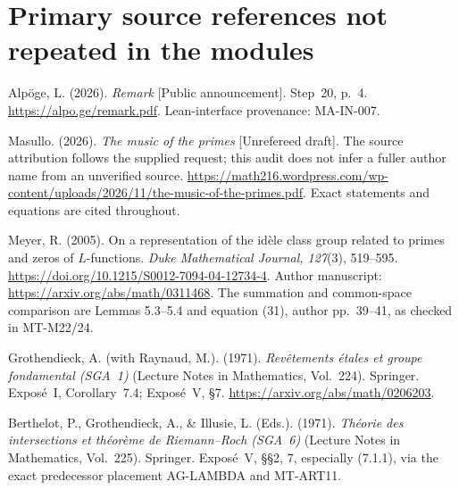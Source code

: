 \documentclass[11pt,a4paper]{article}
\begin{document}
\section{Primary source references not repeated in the modules}
Alp\"oge, L. (2026). \emph{Remark} [Public announcement].
Step~20, p.~4. \url{https://alpo.ge/remark.pdf}.
Lean-interface provenance: MA-IN-007.

Masullo. (2026). \emph{The music of the primes} [Unrefereed draft].
The source attribution follows the supplied request; this audit
does not infer a fuller author name from an unverified source.
\url{https://math216.wordpress.com/wp-content/uploads/2026/11/the-music-of-the-primes.pdf}.
Exact statements and equations are cited throughout.

Meyer, R. (2005). On a representation of the id\`ele class group
related to primes and zeros of $L$-functions.
\emph{Duke Mathematical Journal, 127}(3), 519--595.
\url{https://doi.org/10.1215/S0012-7094-04-12734-4}.
Author manuscript: \url{https://arxiv.org/abs/math/0311468}.
The summation and common-space comparison are Lemmas 5.3--5.4
and equation (31), author pp.~39--41, as checked in MT-M22/24.

Grothendieck, A. (with Raynaud, M.). (1971).
\emph{Rev\^etements \'etales et groupe fondamental (SGA~1)}
(Lecture Notes in Mathematics, Vol.~224). Springer.
Expos\'e~I, Corollary~7.4; Expos\'e~V, \S7.
\url{https://arxiv.org/abs/math/0206203}.

Berthelot, P., Grothendieck, A., \& Illusie, L. (Eds.). (1971).
\emph{Th\'eorie des intersections et th\'eor\`eme de Riemann--Roch
(SGA~6)} (Lecture Notes in Mathematics, Vol.~225). Springer.
Expos\'e~V, \S\S2, 7, especially (7.1.1), via the exact
predecessor placement AG-LAMBDA and MT-ART11.
\end{document}

